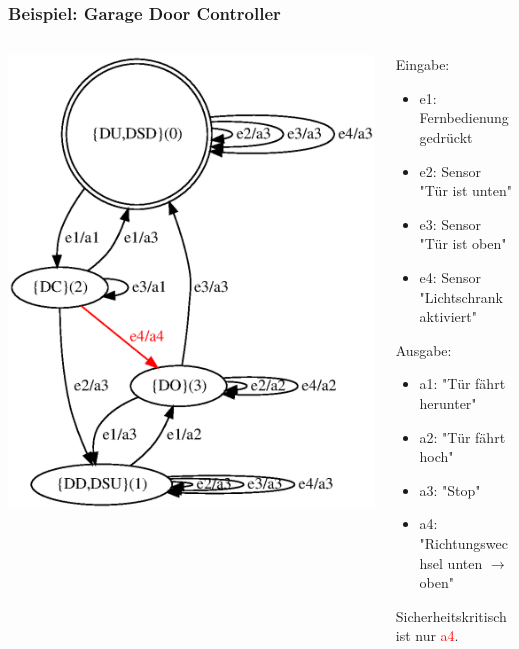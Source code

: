 \documentclass[10pt]{beamer}
\begin{document}
\begin{frame}
\frametitle{Beispiel: Garage Door Controller}
\begin{columns}[T] %
\begin{column}{.55\textwidth}

\includegraphics[width=\textwidth]{images/gdc_min_colored}
\end{column}%
\hfill%
\begin{column}{.55\textwidth}
Eingabe:
\begin{itemize}
  \item e1: Fernbedienung gedrückt
  \item e2: Sensor "Tür ist unten"
  \item e3: Sensor "Tür ist oben"
  \item e4: Sensor "Lichtschrank aktiviert"
\end{itemize}
Ausgabe:
\begin{itemize}
  \item a1: "Tür fährt herunter"
  \item a2: "Tür fährt hoch"
  \item a3: "Stop"
  \item a4: "Richtungswechsel unten $\rightarrow$ oben"
\end{itemize}
Sicherheitskritisch ist nur \textcolor{red}{a4}.
\end{column}%
\end{columns}
\end{frame}
\end{document}
